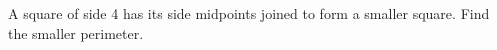 A square of side 4 has its side midpoints joined to form a smaller square. Find the smaller perimeter.
